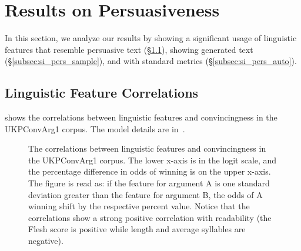 \section{Results on Persuasiveness}
\label{sec:pers_results}

In this section, we analyze our results by showing a significant usage of linguistic features that resemble persuasive text (\S\ref{subsec:si_pers_corr}), showing generated text (\S\ref{subsec:si_pers_sample}), and with standard metrics (\S\ref{subsec:si_pers_auto}).  

\subsection{Linguistic Feature Correlations}
\label{subsec:si_pers_corr}

 shows the correlations between linguistic features and convincingness in the UKPConvArg1 corpus. The model details are in~.
\begin{figure}[h]
  \centering
  \caption{The correlations between linguistic features and convincingness in the UKPConvArg1 corpus. The lower x-axis is in the logit scale, and the percentage difference in odds of winning is on the upper x-axis. The figure is read as: if the feature for argument A is one standard deviation greater than the feature for argument B, the odds of A winning shift by the respective percent value. Notice that the correlations show a strong positive correlation with readability (\eg the Flesh score is positive while length and average syllables are negative). }
  \label{fig:feature_correlations}
\end{figure}

